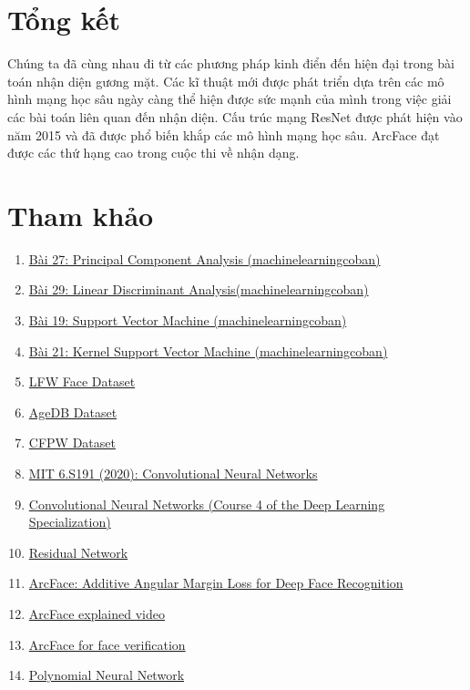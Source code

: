 \documentclass[a4paper, 12pt]{article}
\begin{document}
\section{Tổng kết}
Chúng ta đã cùng nhau đi từ các phương pháp kinh điển đến hiện đại trong bài toán nhận diện gương mặt. Các kĩ thuật mới được phát triển dựa trên các mô hình mạng học sâu ngày càng thể hiện được sức mạnh của mình trong việc giải các bài toán liên quan đến nhận diện. 
Cấu trúc mạng ResNet được phát hiện vào năm 2015 và đã được phổ biến khắp các mô hình mạng học sâu. ArcFace đạt được các thứ hạng cao trong cuộc thi về nhận dạng.

\section{Tham khảo}

\begin{enumerate}
    \item \href{https://machinelearningcoban.com/2017/06/15/pca/}{Bài 27: Principal Component Analysis (machinelearningcoban)}
    \item \href{https://machinelearningcoban.com/2017/06/30/lda/}{Bài 29: Linear Discriminant Analysis(machinelearningcoban)}
    \item \href{https://machinelearningcoban.com/2017/04/09/smv/}{Bài 19: Support Vector Machine (machinelearningcoban)}
    \item \href{https://machinelearningcoban.com/2017/04/22/kernelsmv/}{Bài 21: Kernel Support Vector Machine (machinelearningcoban)}
    \item \href{http://vis-www.cs.umass.edu/lfw/}{LFW Face Dataset}
    \item \href{https://ibug.doc.ic.ac.uk/media/uploads/documents/agedb.pdf}{AgeDB Dataset}
    \item \href{http://www.cfpw.io/paper.pdf}{CFPW Dataset}
    \item \href{https://www.youtube.com/watch?v=iaSUYvmCekI}{MIT 6.S191 (2020): Convolutional Neural Networks}
    \item \href{https://www.youtube.com/playlist?list=PLkDaE6sCZn6Gl29AoE31iwdVwSG-KnDzF}{Convolutional Neural Networks (Course 4 of the Deep Learning Specialization) }
    \item \href{https://arxiv.org/pdf/1512.03385.pdf}{Residual Network}
    \item \href{https://arxiv.org/abs/1801.07698}{ArcFace: Additive Angular Margin Loss for Deep Face Recognition}
    \item \href{https://www.youtube.com/watch?v=H1qEp_czI1I&t=51s}{ArcFace explained video}
    \item \href{https://github.com/peteryuX/arcface-tf2}{ArcFace for face verification}
    \item \href{https://arxiv.org/pdf/2006.13026v2.pdf}{Polynomial Neural Network}
\end{enumerate}
\end{document}
